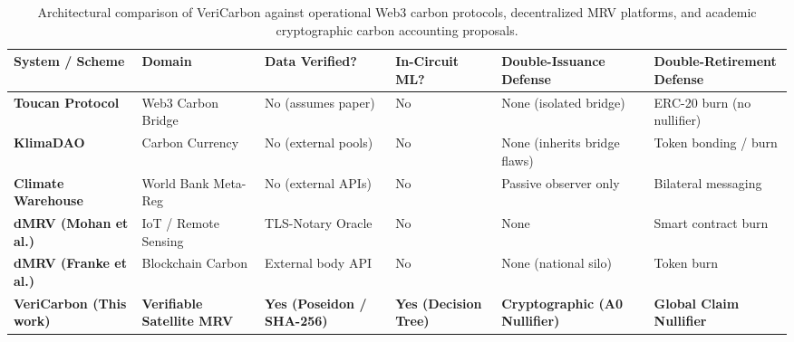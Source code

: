 \begin{table}[t]
\centering
\small
\caption{Architectural comparison of VeriCarbon against operational Web3 carbon protocols, decentralized MRV platforms, and academic cryptographic carbon accounting proposals.}
\label{tab:related_work}
\begin{tabular}{p{3.2cm}p{2.6cm}p{2.4cm}p{1.8cm}p{2.8cm}p{2.8cm}}
\hline
\textbf{System / Scheme} & \textbf{Domain} & \textbf{Data Verified?} & \textbf{In-Circuit ML?} & \textbf{Double-Issuance Defense} & \textbf{Double-Retirement Defense} \\
\hline
\textbf{Toucan Protocol \cite{toucan2022protocol}} & Web3 Carbon Bridge & No (assumes paper) & No & None (isolated bridge) & ERC-20 burn (no nullifier) \\
\textbf{KlimaDAO \cite{klimadao2022algorithmic}} & Carbon Currency & No (external pools) & No & None (inherits bridge flaws) & Token bonding / burn \\
\textbf{Climate Warehouse \cite{worldbank2022warehouse}} & World Bank Meta-Reg & No (external APIs) & No & Passive observer only & Bilateral messaging \\
\textbf{dMRV (Mohan et al.) \cite{mohan2023blockchain}} & IoT / Remote Sensing & TLS-Notary Oracle & No & None & Smart contract burn \\
\textbf{dMRV (Franke et al.) \cite{franke2022operationalizing}} & Blockchain Carbon & External body API & No & None (national silo) & Token burn \\
\hline
\textbf{VeriCarbon (This work)} & \textbf{Verifiable Satellite MRV} & \textbf{Yes (Poseidon / SHA-256)} & \textbf{Yes (Decision Tree)} & \textbf{Cryptographic (A0 Nullifier)} & \textbf{Global Claim Nullifier} \\
\hline
\end{tabular}
\end{table}
